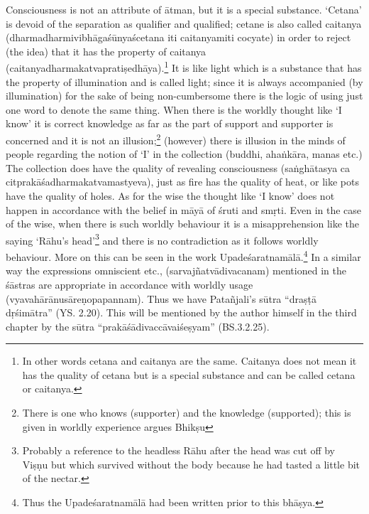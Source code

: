 Consciousness is not an attribute of ātman, but it is a special substance. ‘Cetana’ is devoid of the separation as qualifier and qualified; cetane is also called caitanya (dharmadharmivibhāgaśūnyaścetana iti caitanyamiti cocyate) in order to reject (the idea) that it has the property of caitanya (caitanyadharmakatvapratiṣedhāya).\footnote{In other words cetana and caitanya are the same. Caitanya does not mean it has the quality of cetana but is a special substance and can be called cetana or caitanya.} It is like light which is a substance that has the property of illumination and is called light; since it is always accompanied (by illumination) for the sake of being non-cumbersome there is the logic of using just one word to denote the same thing. When there is the worldly thought like ‘I know’ it is correct knowledge as far as the part of support and supporter is concerned and it is not an illusion;\footnote{There is one who knows (supporter) and the knowledge (supported); this is given in worldly experience argues Bhikṣu} (however) there is illusion in the minds of people regarding the notion of ‘I’ in the collection (buddhi, ahaṅkāra,  manas etc.) The collection does have the quality of revealing consciousness (saṅghātasya ca citprakāśadharmakatvamastyeva), just as fire has the quality of heat, or like pots have the quality of holes. As for the wise the thought like ‘I know’ does not happen in accordance with the belief in māyā of śruti and smṛti. Even in the case of the wise, when there is such worldly behaviour it is a misapprehension like the saying ‘Rāhu’s head’\footnote{Probably a reference to the headless Rāhu after the head was cut off by Viṣṇu but which survived without the body because he had tasted a little bit of the nectar.} and  there is no contradiction as it follows worldly behaviour. More on this can be seen in the work Upadeśaratnamālā.\footnote{Thus the Upadeśaratnamālā had been written prior to this bhāṣya.} In a similar way the expressions omniscient etc., (sarvajñatvādivacanam) mentioned in the śāstras are appropriate in accordance with worldly usage (vyavahārānusāreṇopapannam). Thus we have Patañjali’s sūtra “draṣṭā dṛśimātra” (YS. 2.20). This will be mentioned by the author himself in the third chapter by the sūtra “prakāśādivaccāvaiśeṣyam” (BS.3.2.25).

